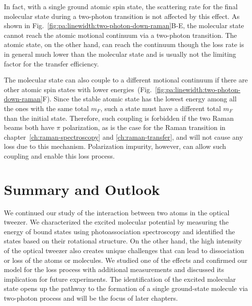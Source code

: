 In fact, with a single ground atomic spin state, the scattering rate for the final molecular
state during a two-photon transition is not affected by this effect.
As shown in Fig.~\ref{fig:pa:linewidth:two-photon-down-raman}B-E,
the molecular state cannot reach the atomic motional continuum via a two-photon transition.
The atomic state, on the other hand, can reach the continuum though the loss rate is in general
much lower than the molecular state
and is usually not the limiting factor for the transfer efficiency.

The molecular state can also couple to a different motional continuum if there are other
atomic spin states with lower energies~(Fig.~\ref{fig:pa:linewidth:two-photon-down-raman}F).
Since the stable atomic state has the lowest energy among all the ones with the same total $m_F$,
such a state must have a different total $m_F$ than the initial state.
Therefore, such coupling is forbidden if the two Raman beams both have $\pi$ polarization,
as is the case for the Raman transition in chapter~\ref{ch:raman-spectroscopy}
and \ref{ch:raman-transfer}, and will not cause any loss due to this mechanism.
Polarization impurity, however, can allow such coupling and enable this loss process.

\section{Summary and Outlook}
\label{ch:pa:summary}
We continued our study of the interaction between two atoms in the optical tweezer.
We characterized the excited molecular potential by measuring
the energy of bound states using photoassociation spectroscopy
and identified the states based on their rotational structure.
On the other hand, the high intensity of the optical tweezer
also creates unique challenges that can lead to dissociation or loss of the atoms or molecules.
We studied one of the effects and confirmed our model for the loss process with
additional measurements and discussed its implication for future experiments.
The identification of the excited molecular state opens up the pathway
to the formation of a single ground-state molecule via two-photon process
and will be the focus of later chapters.
